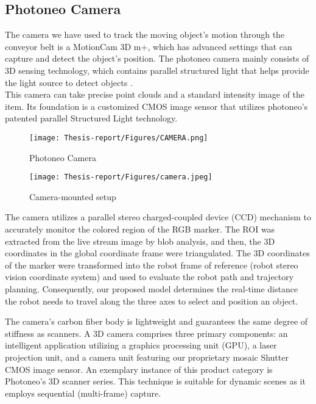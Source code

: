 \documentclass[12pt]{article}
\begin{document}
\subsection{Photoneo Camera}


The camera we have used to track the moving object's motion through the conveyor belt is a 
MotionCam 3D m+, which has advanced settings that can capture and detect the object's position. The photoneo camera mainly consists of 3D sensing technology, which contains parallel structured light that helps provide the light source to detect objects \cite{ref2}.\\

This camera can take precise point clouds and a standard intensity image of the item.  Its foundation is a customized CMOS image sensor that utilizes photoneo's patented parallel Structured Light technology\cite{ref15}.

\begin{figure}[h]
    \centering
    \texttt{[image: Thesis-report/Figures/CAMERA.png]}
    \caption{Photoneo Camera \cite{ref2}} 
    \label{fig:Photoneo-camera}
\end{figure}

\begin{figure}[h]
    \centering
    \texttt{[image: Thesis-report/Figures/camera.jpeg]}
    \caption{Camera-mounted setup}
    \label{fig:camera-setup}
\end{figure}

The camera utilizes a parallel stereo charged-coupled device (CCD) mechanism to accurately monitor the colored region of the RGB marker.  The ROI was extracted from the live stream image by blob analysis, and then, the 3D coordinates in the global coordinate frame were triangulated. The 3D coordinates of the marker were transformed into the robot frame of reference (robot stereo vision coordinate system) and used to evaluate the robot path and trajectory planning.   Consequently, our proposed model determines the real-time distance the robot needs to travel along the three axes to select and position an object\cite{ref15}.

The camera's carbon fiber body is lightweight and guarantees the same degree of stiffness as scanners. A 3D camera comprises three primary components: an intelligent application utilizing a graphics processing unit (GPU), a laser projection unit, and a camera unit featuring our proprietary mosaic Shutter CMOS image sensor.    An exemplary instance of this product category is Photoneo's 3D scanner series.  This technique is suitable for dynamic scenes as it employs sequential (multi-frame) capture\cite{ref15}.
\end{document}
